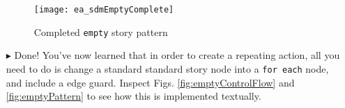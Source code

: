 \begin{itemize}
\begin{figure}[htbp]
\begin{center}
  \texttt{[image: ea\_sdmEmptyComplete]}
  \caption{Completed \texttt{empty} story pattern}  
  \label{fig:sdm_end}
\end{center}
\end{figure}

\item[$\blacktriangleright$] Done! You've now learned that in order to create a repeating action, all you need to do is change a standard standard story node
into a \texttt{for each} node, and include a edge guard. Inspect Figs. \ref{fig:emptyControlFlow} and \ref{fig:emptyPattern} to see how this is implemented
textually.


\end{itemize}

